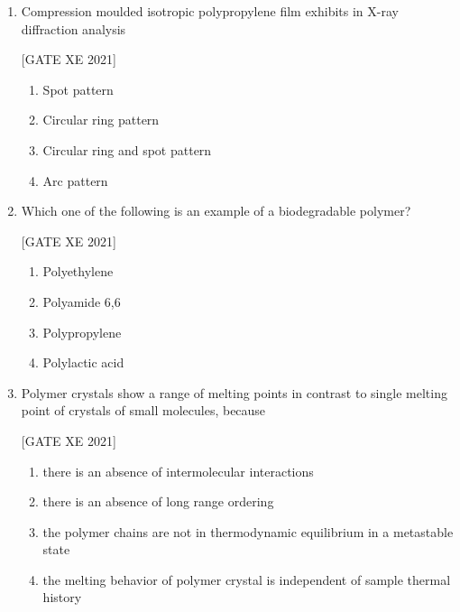 \documentclass[journal,12pt,onecolumn]{IEEEtran}
\theoremstyle{remark}
\begin{document}
\begin{enumerate}[resume]
\hfill[GATE XE 2021]

\begin{multicols}{2}
    \begin{enumerate}
        \item Polyamide 6,6
        \item Poly(ethylene terephthalate)
        \item Vulcanized polybutadiene
        \item High density polyethylene
    \end{enumerate}
\end{multicols}

\item Compression moulded isotropic polypropylene film exhibits in X-ray diffraction analysis

\hfill[GATE XE 2021]

\begin{multicols}{2}
\begin{enumerate}
\item Spot pattern
\item Circular ring pattern
\item Circular ring and spot pattern
\item Arc pattern
\end{enumerate}
\end{multicols}


\item Which one of the following is an example of a biodegradable polymer?

\hfill[GATE XE 2021]

\begin{multicols}{2}
\begin{enumerate}
\item Polyethylene
\item Polyamide 6,6
\item Polypropylene
\item Polylactic acid
\end{enumerate}
\end{multicols}


\item Polymer crystals show a range of melting points in contrast to single melting point of crystals of small molecules, because

\hfill[GATE XE 2021]

\begin{multicols}{2}
\begin{enumerate}
\item there is an absence of intermolecular interactions
\item there is an absence of long range ordering
\item the polymer chains are not in thermodynamic equilibrium in a metastable state
\item the melting behavior of polymer crystal is independent of sample thermal history
\end{enumerate}
\end{multicols}



\end{enumerate}
\end{document}
